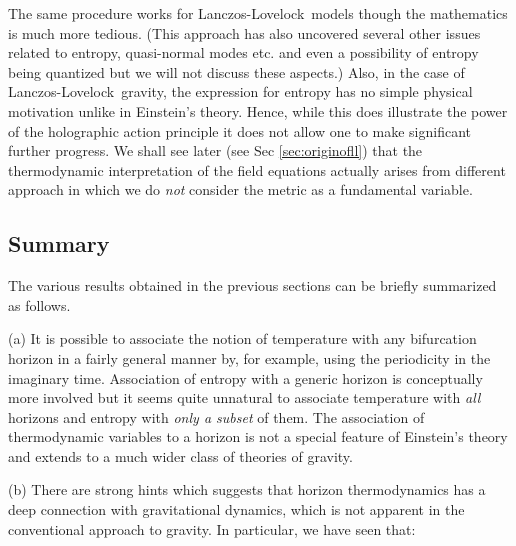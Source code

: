 \documentclass[12pt]{iopart}
\newcommand{\LL}{Lanczos-Lovelock}
\begin{document}
The same procedure works for \LL\ models though the mathematics is much more tedious.
(This approach has also uncovered several other issues related to entropy, quasi-normal modes etc. and even a possibility of entropy being quantized \cite{entropyideas} but we will not discuss these aspects.)
Also, in the case of \LL\ gravity, the expression for entropy has no simple physical motivation unlike in Einstein's theory. Hence, while this does illustrate the power of the holographic action principle it does not allow one to make significant further progress. We shall see later (see Sec \ref{sec:originofll}) that the thermodynamic interpretation of the field equations actually arises from different approach in which we do \textit{not} consider the metric as a fundamental variable.

\subsection{Summary}

The various results obtained in the previous sections can be briefly summarized as follows. 

(a) It is possible to associate the notion of temperature with any bifurcation horizon in a fairly general manner by, for example, using the periodicity in the imaginary time.
Association of entropy with  a generic horizon is conceptually more involved but it seems quite unnatural to associate temperature with \textit{all} horizons and entropy with \textit{only a subset} of them. 
 The association of thermodynamic variables to  a horizon is not a special feature
of Einstein's theory and extends to a much wider class of theories of gravity. 

(b) There are strong hints which suggests that horizon thermodynamics has a deep connection with gravitational dynamics, which is not apparent in the conventional approach to gravity. 
In particular, we have seen that:
\end{document}
